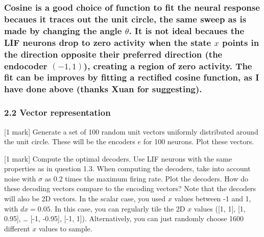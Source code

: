 \documentclass{article}
\begin{document}
    \subsubsection{Cosine is a good choice of function to fit the neural
response becaues it traces out the unit circle, the same sweep as is
made by changing the angle $\theta$. It is not ideal becaues the LIF
neurons drop to zero activity when the state $x$ points in the direction
opposite their preferred direction (the endocoder $(-1,1)$), creating a
region of zero activity. The fit can be improves by fitting a rectified
cosine function, as I have done above (thanks Xuan for
suggesting).}\label{cosine-is-a-good-choice-of-function-to-fit-the-neural-response-becaues-it-traces-out-the-unit-circle-the-same-sweep-as-is-made-by-changing-the-angle-theta.-it-is-not-ideal-becaues-the-lif-neurons-drop-to-zero-activity-when-the-state-x-points-in-the-direction-opposite-their-preferred-direction-the-endocoder--11-creating-a-region-of-zero-activity.-the-fit-can-be-improves-by-fitting-a-rectified-cosine-function-as-i-have-done-above-thanks-xuan-for-suggesting.}

    \subsubsection{2.2 Vector representation}\label{vector-representation}

    {[}1 mark{]} Generate a set of 100 random unit vectors uniformly
distributed around the unit circle. These will be the encoders $e$ for
100 neurons. Plot these vectors.

{[}1 mark{]} Compute the optimal decoders. Use LIF neurons with the same
properties as in question 1.3. When computing the decoders, take into
account noise with $\sigma$ as 0.2 times the maximum firing rate. Plot
the decoders. How do these decoding vectors compare to the encoding
vectors? Note that the decoders will also be 2D vectors. In the scalar
case, you used $x$ values between -1 and 1, with $dx=0.05$. In this
case, you can regularly tile the 2D $x$ values ({[}1, 1{]}, {[}1,
0.95{]}, \ldots{} {[}-1, -0.95{]}, {[}-1, 1{]}). Alternatively, you can
just randomly choose 1600 different $x$ values to sample.
\end{document}
